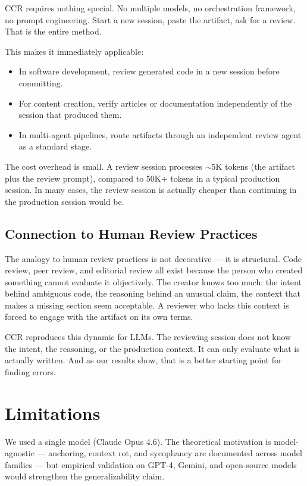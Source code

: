 \documentclass[11pt]{article}
\begin{document}
CCR requires nothing special. No multiple models, no orchestration framework, no prompt engineering. Start a new session, paste the artifact, ask for a review. That is the entire method.

This makes it immediately applicable:

\begin{itemize}
\item In software development, review generated code in a new session before committing.
\item For content creation, verify articles or documentation independently of the session that produced them.
\item In multi-agent pipelines, route artifacts through an independent review agent as a standard stage.
\end{itemize}

The cost overhead is small. A review session processes $\sim$5K tokens (the artifact plus the review prompt), compared to 50K+ tokens in a typical production session. In many cases, the review session is actually cheaper than continuing in the production session would be.

\subsection{Connection to Human Review Practices}

The analogy to human review practices is not decorative --- it is structural. Code review, peer review, and editorial review all exist because the person who created something cannot evaluate it objectively. The creator knows too much: the intent behind ambiguous code, the reasoning behind an unusual claim, the context that makes a missing section seem acceptable. A reviewer who lacks this context is forced to engage with the artifact on its own terms.

CCR reproduces this dynamic for LLMs. The reviewing session does not know the intent, the reasoning, or the production context. It can only evaluate what is actually written. And as our results show, that is a better starting point for finding errors.

\section{Limitations}

We used a single model (Claude Opus 4.6). The theoretical motivation is model-agnostic --- anchoring, context rot, and sycophancy are documented across model families --- but empirical validation on GPT-4, Gemini, and open-source models would strengthen the generalizability claim.
\end{document}
